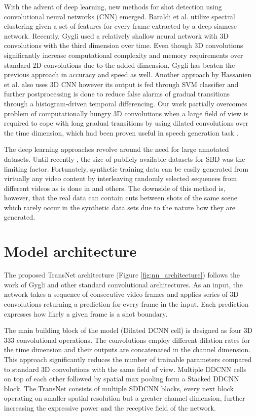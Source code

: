 With the advent of deep learning, new methods for shot detection using convolutional neural networks (CNN) emerged. Baraldi et al. \cite{Baraldi15} utilize spectral clustering given a set of features for every frame extracted by a deep siamese network. Recently, Gygli \cite{Gygli18} used a relatively shallow neural network with 3D convolutions with the third dimension over time. Even though 3D convolutions significantly increase computational complexity and memory requirements over standard 2D convolutions due to the added dimension, Gygli has beaten the previous approach in accuracy and speed as well. Another approach by Hassanien et al. \cite{Hassanien17} also uses 3D CNN however its output is fed through SVM classifier and further postprocessing is done to reduce false alarms of gradual transitions through a histogram-driven temporal differencing.
Our work partially overcomes problem of computationally hungry 3D convolutions when a large field of view is required to cope with long gradual transitions by using dilated convolutions over the time dimension, which had been proven useful in speech generation task \cite{oord16}.

The deep learning approaches revolve around the need for large annotated datasets. Until recently \cite{Tang2018}, the size of publicly available datasets for SBD was the limiting factor. Fortunately, synthetic training data can be easily generated from virtually any video content by interleaving randomly selected sequences from different videos as is done in \cite{Gygli18} and others. The downside of this method is, however, that the real data can contain cuts between shots of the same scene which rarely occur in the synthetic data sets due to the nature how they are generated.

\section{Model architecture}

The proposed TransNet architecture (Figure \ref{fig:nn_architecture}) follows the work of Gygli \cite{Gygli18} and other standard convolutional architectures. As an input, the network takes a sequence of  consecutive video frames and applies series of 3D convolutions returning a prediction for every frame in the input. Each prediction expresses how likely a given frame is a shot boundary.

The main building block of the model (Dilated DCNN cell) is designed as four 3D 333 convolutional operations. The convolutions employ different dilation rates for the time dimension and their outputs are concatenated in the channel dimension. This approach significantly reduces the number of trainable parameters compared to standard 3D convolutions with the same field of view. Multiple DDCNN cells on top of each other followed by spatial max pooling form a Stacked DDCNN block. The TransNet consists of multiple SDDCNN blocks, every next block operating on smaller spatial resolution but a greater channel dimension, further increasing the expressive power and the receptive field of the network.

